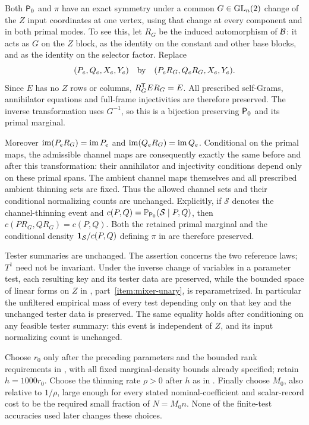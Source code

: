 \begin{remark}\label{rem:Z-reparametrization}
Both ${\mathsf P_0}$ and $\pi$ have an exact symmetry under a common
$G\in\operatorname{GL}_n(2)$ change of the $Z$ input coordinates at one vertex,
using that change at every component and in both primal modes.
To see this, let $R_G$ be the induced automorphism of $\mathcal B$: it
acts as $G$ on the $Z$ block, as the identity on the constant and
other base blocks, and as the identity on the selector factor.
Replace
\[
 (P_e,Q_e,X_e,Y_e)
 \quad\hbox{by}\quad
 (P_eR_G,Q_eR_G,X_e,Y_e).
\]
Since $E$ has no $Z$ rows or columns, $R_G^{\mathsf T} E R_G=E$.
All prescribed self-Grams, annihilator equations and full-frame
injectivities are therefore preserved.  The inverse transformation
uses $G^{-1}$, so this is a bijection preserving ${\mathsf P_0}$ and its
primal marginal.

Moreover $\operatorname{im}(P_eR_G)=\operatorname{im} P_e$ and
$\operatorname{im}(Q_eR_G)=\operatorname{im} Q_e$.  Conditional on the primal maps, the
admissible channel maps are consequently exactly the same before
and after this transformation: their annihilator and injectivity
conditions depend only on these primal spans.  The ambient channel
maps themselves and all prescribed ambient thinning sets are fixed.
Thus the allowed channel sets and their conditional normalizing
counts are unchanged.  Explicitly, if $\mathcal S$ denotes the
channel-thinning event and $c(P,Q)=\mathbb P_{{\mathsf P_0}}(\mathcal S\mid P,Q)$,
then $c(PR_G,QR_G)=c(P,Q)$.  Both the retained primal marginal
and the conditional density $\mathbf 1_{\mathcal S}/c(P,Q)$ defining
$\pi$ in  are therefore preserved.

Tester summaries are unchanged.  The assertion concerns the two
reference laws; $T^1$ need not be invariant.  Under the inverse
change of variables in a parameter test, each resulting key and
its tester data are preserved, while the bounded space of linear
forms on $Z$ in ,
part~\ref{item:mixer-unary}, is reparametrized.  In particular the
unfiltered empirical mass of every test depending only on that key
and the unchanged tester data is preserved.  The same equality holds
after conditioning on any feasible tester summary: this event is
independent of $Z$, and its input normalizing count is unchanged.
\end{remark}

Choose $r_0$ only after the preceding parameters and the bounded
rank requirements in , with all
fixed marginal-density bounds already specified; retain
$h=1000r_0$.  Choose the thinning rate $\rho>0$ after $h$ as in
.  Finally choose $M_0$, also relative to
$1/\rho$, large enough for every stated nominal-coefficient and
scalar-record cost to be the required small fraction of $N=M_0n$.  None of the finite-test accuracies
used later changes these choices.

